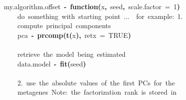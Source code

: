 \documentclass[a4paper]{article}\usepackage{graphicx, color}
\makeatletter
\newcommand{\hlnumber}[1]{\textcolor[rgb]{0,0,0}{#1}}%
\newcommand{\hlfunctioncall}[1]{\textcolor[rgb]{0.501960784313725,0,0.329411764705882}{\textbf{#1}}}%
\newcommand{\hlkeyword}[1]{\textcolor[rgb]{0,0,0}{\textbf{#1}}}%
\newcommand{\hlargument}[1]{\textcolor[rgb]{0.690196078431373,0.250980392156863,0.0196078431372549}{#1}}%
\newcommand{\hlcomment}[1]{\textcolor[rgb]{0.180392156862745,0.6,0.341176470588235}{#1}}%
\newcommand{\hlformalargs}[1]{\textcolor[rgb]{0.690196078431373,0.250980392156863,0.0196078431372549}{#1}}%
\newcommand{\hleqformalargs}[1]{\textcolor[rgb]{0.690196078431373,0.250980392156863,0.0196078431372549}{#1}}%
\newcommand{\hlassignement}[1]{\textcolor[rgb]{0,0,0}{\textbf{#1}}}%
\newcommand{\hlsymbol}[1]{\textcolor[rgb]{0,0,0}{#1}}%
\newcommand{\hlstd}[1]{\textcolor[rgb]{0,0,0}{#1}}%
\newenvironment{kframe}{%
 \def\FrameCommand##1{\hskip\@totalleftmargin \hskip-\fboxsep
 \colorbox{shadecolor}{##1}\hskip-\fboxsep
     \hskip-\linewidth \hskip-\@totalleftmargin \hskip\columnwidth}%
 \MakeFramed {\advance\hsize-\width
   \@totalleftmargin\z@ \linewidth\hsize
   \@setminipage}}%
 {\par\unskip\endMakeFramed}
\newenvironment{knitrout}{}{} %
\makeatother
\begin{document}
\begin{knitrout}
\color{fgcolor}\begin{kframe}
\begin{flushleft}
\ttfamily\noindent
\hlsymbol{my.algorithm.offset}{\ }\hlassignement{\usebox{\hlnormalsizeboxlessthan}-}{\ }\hlkeyword{function}\hlkeyword{(}\hlformalargs{x}\hlkeyword{,}{\ }\hlformalargs{seed}\hlkeyword{,}{\ }\hlformalargs{scale.factor}{\ }\hleqformalargs{=}{\ }\hlnumber{1}\hlkeyword{)}{\ }\hlkeyword{\usebox{\hlnormalsizeboxopenbrace}}\hspace*{\fill}\\
\hlstd{}{\ }{\ }{\ }{\ }\hlcomment{\usebox{\hlnormalsizeboxhash}{\ }do{\ }something{\ }with{\ }starting{\ }point{\ }...{\ }{\ }for{\ }example:{\ }1.}\hspace*{\fill}\\
\hlstd{}{\ }{\ }{\ }{\ }\hlcomment{\usebox{\hlnormalsizeboxhash}{\ }compute{\ }principal{\ }components}\hspace*{\fill}\\
\hlstd{}{\ }{\ }{\ }{\ }\hlsymbol{pca}{\ }\hlassignement{\usebox{\hlnormalsizeboxlessthan}-}{\ }\hlfunctioncall{prcomp}\hlkeyword{(}\hlfunctioncall{t}\hlkeyword{(}\hlsymbol{x}\hlkeyword{)}\hlkeyword{,}{\ }\hlargument{retx}{\ }\hlargument{=}{\ }\hlnumber{TRUE}\hlkeyword{)}\hspace*{\fill}\\
\hlstd{}\hspace*{\fill}\\
\hlstd{}{\ }{\ }{\ }{\ }\hlcomment{\usebox{\hlnormalsizeboxhash}{\ }retrieve{\ }the{\ }model{\ }being{\ }estimated}\hspace*{\fill}\\
\hlstd{}{\ }{\ }{\ }{\ }\hlsymbol{data.model}{\ }\hlassignement{\usebox{\hlnormalsizeboxlessthan}-}{\ }\hlfunctioncall{fit}\hlkeyword{(}\hlsymbol{seed}\hlkeyword{)}\hspace*{\fill}\\
\hlstd{}\hspace*{\fill}\\
\hlstd{}{\ }{\ }{\ }{\ }\hlcomment{\usebox{\hlnormalsizeboxhash}{\ }2.{\ }use{\ }the{\ }absolute{\ }values{\ }of{\ }the{\ }first{\ }PCs{\ }for{\ }the}\hspace*{\fill}\\
\hlstd{}{\ }{\ }{\ }{\ }\hlcomment{\usebox{\hlnormalsizeboxhash}{\ }metagenes{\ }Note:{\ }the{\ }factorization{\ }rank{\ }is{\ }stored{\ }in}\hspace*{\fill}\\

\end{flushleft}
\end{kframe}
\end{knitrout}
\end{document}
